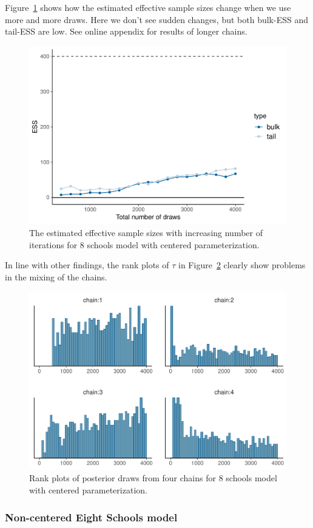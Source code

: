 \documentclass[american,]{article}
\begin{document}
Figure~\ref{fig:change-ess-fit-cp-1} shows how the estimated effective
sample sizes change when we use more and more draws.  Here we don't
see sudden changes, but both bulk-ESS and tail-ESS are low. See online
appendix for results of longer chains.
\begin{figure}[tp]
  \centering
  \includegraphics[width=0.6\linewidth]{graphics/change-ess-fit-cp-1.pdf}
  \caption{The estimated effective sample sizes with increasing number of iterations for 8 schools model with centered parameterization.}
  \label{fig:change-ess-fit-cp-1}
\end{figure}

In line with other findings, the rank plots of $\tau$ in
Figure~\ref{fig:hist-fit-cp-1} clearly show problems in the mixing of
the chains.
\begin{figure}[tp]
  \centering
  \includegraphics[width=0.6\linewidth]{graphics/hist-fit-cp-1.pdf}
  \caption{Rank plots of posterior draws from four chains for 8 schools model with centered parameterization.}
  \label{fig:hist-fit-cp-1}
\end{figure}


\hypertarget{non-centered-eight-schools-model}{%
\subsubsection{Non-centered Eight Schools
model}\label{non-centered-eight-schools-model}}
\end{document}
